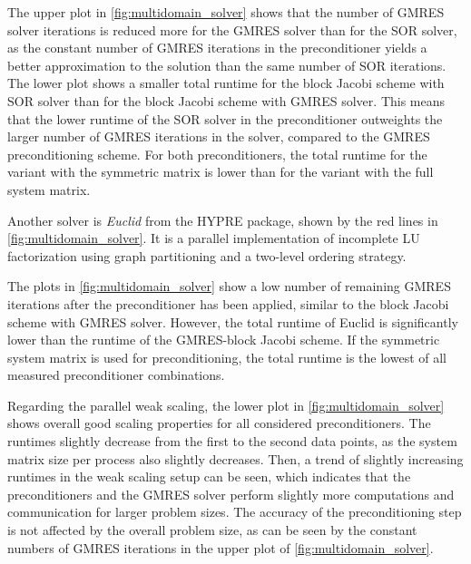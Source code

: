 The upper plot in \cref{fig:multidomain_solver} shows that the number of GMRES solver iterations is reduced more for the GMRES solver than for the SOR solver, as the constant number of GMRES iterations in the preconditioner yields a better approximation to the solution than the same number of SOR iterations. The lower plot shows a smaller total runtime for the block Jacobi scheme with SOR solver than for the block Jacobi scheme with GMRES solver. This means that the lower runtime of the SOR solver in the preconditioner outweights the larger number of GMRES iterations in the solver, compared to the GMRES preconditioning scheme. For both preconditioners, the total runtime for the variant with the symmetric matrix is lower than for the variant with the full system matrix.

Another solver is \emph{Euclid} \cite{euclid} from the HYPRE package, shown by the red lines in \cref{fig:multidomain_solver}. It is a parallel implementation of incomplete LU factorization using graph partitioning and a two-level ordering strategy.

The plots in \cref{fig:multidomain_solver} show a low number of remaining GMRES iterations after the preconditioner has been applied, similar to the block Jacobi scheme with GMRES solver. However, the total runtime of Euclid is significantly lower than the runtime of the GMRES-block Jacobi scheme. If the symmetric system matrix is used for preconditioning, the total runtime is the lowest of all measured preconditioner combinations.

Regarding the parallel weak scaling, the lower plot in \cref{fig:multidomain_solver} shows overall good scaling properties for all considered preconditioners. The runtimes slightly decrease from the first to the second data points, as the system matrix size per process also slightly decreases. Then, a trend of slightly increasing runtimes in the weak scaling setup can be seen, which indicates that the preconditioners and the GMRES solver perform slightly more computations and communication for larger problem sizes. The accuracy of the preconditioning step is not affected by the overall problem size, as can be seen by the constant numbers of GMRES iterations in the upper plot of \cref{fig:multidomain_solver}.

